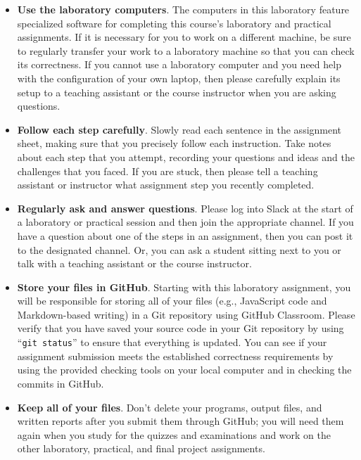 \documentclass[11pt]{article}
\newcommand{\command}[1]{``\lstinline{#1}''}
\begin{document}
\begin{itemize}
  \setlength{\itemsep}{0pt}

\item {\bf Use the laboratory computers}. The computers in this laboratory feature specialized software for completing
  this course's laboratory and practical assignments. If it is necessary for you to work on a different machine, be sure
  to regularly transfer your work to a laboratory machine so that you can check its correctness. If you cannot use a
  laboratory computer and you need help with the configuration of your own laptop, then please carefully explain its
  setup to a teaching assistant or the course instructor when you are asking questions.

\item {\bf Follow each step carefully}. Slowly read each sentence in the assignment sheet, making sure that you
  precisely follow each instruction. Take notes about each step that you attempt, recording your questions and ideas and
  the challenges that you faced. If you are stuck, then please tell a teaching assistant or instructor what assignment
  step you recently completed.

\item {\bf Regularly ask and answer questions}. Please log into Slack at the start of a laboratory or practical session
  and then join the appropriate channel. If you have a question about one of the steps in an assignment, then you can
  post it to the designated channel. Or, you can ask a student sitting next to you or talk with a teaching assistant or
  the course instructor.

\item {\bf Store your files in GitHub}. Starting with this laboratory assignment, you will be responsible for storing
  all of your files (e.g., JavaScript code and Markdown-based writing) in a Git repository using GitHub Classroom.
  Please verify that you have saved your source code in your Git repository by using \command{git status} to ensure that
  everything is updated. You can see if your assignment submission meets the established correctness requirements by
  using the provided checking tools on your local computer and in checking the commits in GitHub.

\item {\bf Keep all of your files}. Don't delete your programs, output files, and written reports after you submit them
  through GitHub; you will need them again when you study for the quizzes and examinations and work on the other
  laboratory, practical, and final project assignments.


\end{itemize}
\end{document}
